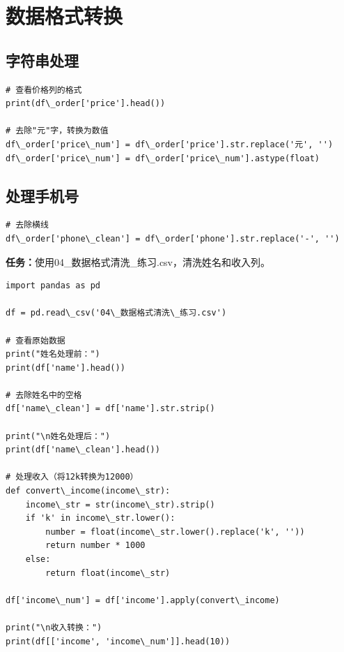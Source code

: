 \documentclass[12pt,a4paper]{article}
\begin{document}
\section{数据格式转换}

\subsection{字符串处理}

\begin{lstlisting}[caption={处理价格列}]
# 查看价格列的格式
print(df\_order['price'].head())

# 去除"元"字，转换为数值
df\_order['price\_num'] = df\_order['price'].str.replace('元', '')
df\_order['price\_num'] = df\_order['price\_num'].astype(float)
\end{lstlisting}

\subsection{处理手机号}

\begin{lstlisting}[caption={标准化手机号}]
# 去除横线
df\_order['phone\_clean'] = df\_order['phone'].str.replace('-', '')
\end{lstlisting}

\begin{practicebox}
\textbf{任务：}使用04\_数据格式清洗\_练习.csv，清洗姓名和收入列。

\begin{lstlisting}
import pandas as pd

df = pd.read\_csv('04\_数据格式清洗\_练习.csv')

# 查看原始数据
print("姓名处理前：")
print(df['name'].head())

# 去除姓名中的空格
df['name\_clean'] = df['name'].str.strip()

print("\n姓名处理后：")
print(df['name\_clean'].head())

# 处理收入（将12k转换为12000）
def convert\_income(income\_str):
    income\_str = str(income\_str).strip()
    if 'k' in income\_str.lower():
        number = float(income\_str.lower().replace('k', ''))
        return number * 1000
    else:
        return float(income\_str)

df['income\_num'] = df['income'].apply(convert\_income)

print("\n收入转换：")
print(df[['income', 'income\_num']].head(10))
\end{lstlisting}
\end{practicebox}
\end{document}

